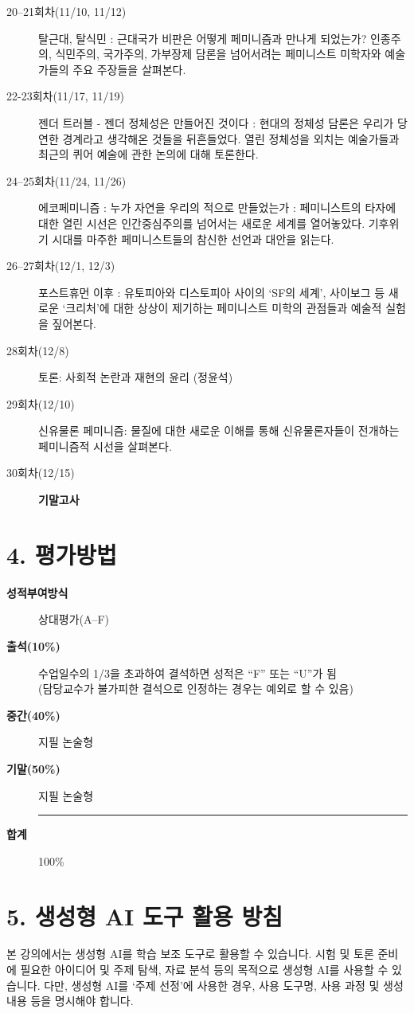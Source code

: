 \documentclass{article}
\newcommand{\descriptionrule}{%
  \item[]\vspace{-0.6em}
  \noindent\hspace*{-\leftmargin}%
  \rule{0.6\linewidth}{0.4pt}
  \vspace{-0.4em}
}
\begin{document}
\begin{description}
    \item[20--21회차(11/10, 11/12)] 탈근대, 탈식민 : 근대국가 비판은 어떻게 페미니즘과 만나게 되었는가? 인종주의, 식민주의, 국가주의, 가부장제 담론을 넘어서려는 페미니스트 미학자와 예술가들의 주요 주장들을 살펴본다.
    \item[22-23회차(11/17, 11/19)] 젠더 트러블 - 젠더 정체성은 만들어진 것이다 : 현대의 정체성 담론은 우리가 당연한 경계라고 생각해온 것들을 뒤흔들었다. 열린 정체성을 외치는 예술가들과 최근의 퀴어 예술에 관한 논의에 대해 토론한다.
    \item[24--25회차(11/24, 11/26)] 에코페미니즘 : 누가 자연을 우리의 적으로 만들었는가 : 페미니스트의 타자에 대한 열린 시선은 인간중심주의를 넘어서는 새로운 세계를 열어놓았다. 기후위기 시대를 마주한 페미니스트들의 참신한 선언과 대안을 읽는다.
    \item[26--27회차(12/1, 12/3)] 포스트휴먼 이후 : 유토피아와 디스토피아 사이의 `SF의 세계', 사이보그 등 새로운 `크리처'에 대한 상상이 제기하는 페미니스트 미학의 관점들과 예술적 실험을 짚어본다.
    \item[28회차(12/8)] 토론: 사회적 논란과 재현의 윤리 (정윤석)
    \item[29회차(12/10)] 신유물론 페미니즘: 물질에 대한 새로운 이해를 통해 신유물론자들이 전개하는 페미니즘적 시선을 살펴본다.
    \item[30회차(12/15)] \textbf{기말고사}   
\end{description}

\bigskip
\section{4. 평가방법}
\medskip
\begin{description}
    \item[\textbf{성적부여방식}] 상대평가(A--F)
    \item[\textbf{출석(10\%)}] 수업일수의 1/3을 초과하여 결석하면 성적은 ``F'' 또는 ``U''가 됨\\(담당교수가 불가피한 결석으로 인정하는 경우는 예외로 할 수 있음)
    \item[\textbf{중간(40\%)}] 지필 논술형
    \item[\textbf{기말(50\%)}] 지필 논술형
    \descriptionrule
    \item[\textbf{합계}] 100\%
\end{description}

\newpage
\section{5. 생성형 AI 도구 활용 방침}
\medskip
본 강의에서는 생성형 AI를 학습 보조 도구로 활용할 수 있습니다. 시험 및 토론 준비에 필요한 아이디어 및 주제 탐색, 자료 분석 등의 목적으로 생성형 AI를 사용할 수 있습니다. 다만, 생성형 AI를 ‘주제 선정’에 사용한 경우, 사용 도구명, 사용 과정 및 생성 내용 등을 명시해야 합니다.
\end{document}
